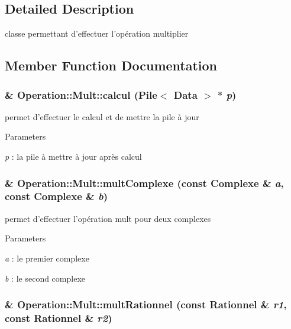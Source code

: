 \subsection{Detailed Description}
classe permettant d'effectuer l'opération multiplier 

\subsection{Member Function Documentation}
\hypertarget{classOperation_1_1Mult_ada56752ff3b1bda104ed35726b3cc153}{
\subsubsection[{calcul}]{ \& Operation::Mult::calcul ({\bf Pile}$<$ {\bf Data} $>$ $\ast$ {\em p})}}
\label{classOperation_1_1Mult_ada56752ff3b1bda104ed35726b3cc153}


permet d'effectuer le calcul et de mettre la pile à jour 


\begin{DoxyParams}{Parameters}
\item[{\em p}]: la pile à mettre à jour après calcul \end{DoxyParams}
\hypertarget{classOperation_1_1Mult_a34c0e501dacbca2626a7e77783724a4e}{
\subsubsection[{multComplexe}]{\& Operation::Mult::multComplexe (const {\bf Complexe} \& {\em a}, \/  const {\bf Complexe} \& {\em b})}}
\label{classOperation_1_1Mult_a34c0e501dacbca2626a7e77783724a4e}


permet d'effectuer l'opération mult pour deux complexes 


\begin{DoxyParams}{Parameters}
\item[{\em a}]: le premier complexe \item[{\em b}]: le second complexe \end{DoxyParams}
\hypertarget{classOperation_1_1Mult_a4de53aba889ab8db3936d3194dea53f1}{
\subsubsection[{multRationnel}]{\& Operation::Mult::multRationnel (const {\bf Rationnel} \& {\em r1}, \/  const {\bf Rationnel} \& {\em r2})}}
\label{classOperation_1_1Mult_a4de53aba889ab8db3936d3194dea53f1}


